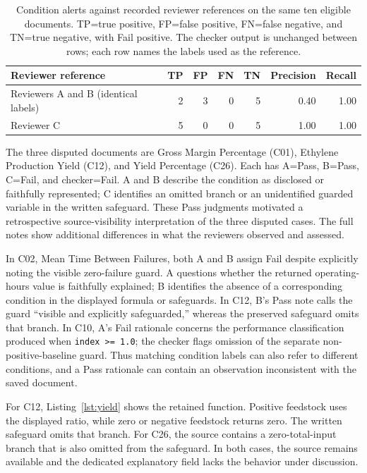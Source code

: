 \documentclass[a4paper,fleqn]{cas-dc}
\begin{document}
\begin{table}[t]
\centering
\caption{Condition alerts against recorded reviewer references on the same ten eligible documents. TP=true positive, FP=false positive, FN=false negative, and TN=true negative, with Fail positive. The checker output is unchanged between rows; each row names the labels used as the reference.}
\label{tab:conditions}
\begin{tabularx}{\textwidth}{@{}Xrrrrrr@{}}
\toprule
Reviewer reference & TP & FP & FN & TN & Precision & Recall \\
\midrule
Reviewers A and B (identical labels) & 2 & 3 & 0 & 5 & 0.40 & 1.00 \\
Reviewer C & 5 & 0 & 0 & 5 & 1.00 & 1.00 \\
\bottomrule
\end{tabularx}
\end{table}

The three disputed documents are Gross Margin Percentage (C01), Ethylene Production Yield (C12), and Yield Percentage (C26). Each has A=Pass, B=Pass, C=Fail, and checker=Fail. A and B describe the condition as disclosed or faithfully represented; C identifies an omitted branch or an unidentified guarded variable in the written safeguard. These Pass judgments motivated a retrospective source-visibility interpretation of the three disputed cases. The full notes show additional differences in what the reviewers observed and assessed.

In C02, Mean Time Between Failures, both A and B assign Fail despite explicitly noting the visible zero-failure guard. A questions whether the returned operating-hours value is faithfully explained; B identifies the absence of a corresponding condition in the displayed formula or safeguards. In C12, B's Pass note calls the guard ``visible and explicitly safeguarded,'' whereas the preserved safeguard omits that branch. In C10, A's Fail rationale concerns the performance classification produced when \texttt{index >= 1.0}; the checker flags omission of the separate non-positive-baseline guard. Thus matching condition labels can also refer to different conditions, and a Pass rationale can contain an observation inconsistent with the saved document.

For C12, Listing~\ref{lst:yield} shows the retained function. Positive feedstock uses the displayed ratio, while zero or negative feedstock returns zero. The written safeguard omits that branch. For C26, the source contains a zero-total-input branch that is also omitted from the safeguard. In both cases, the source remains available and the dedicated explanatory field lacks the behavior under discussion.
\end{document}
